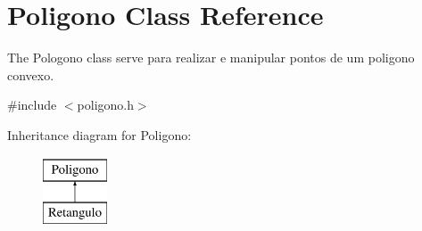 \hypertarget{class_poligono}{}\section{Poligono Class Reference}
\label{class_poligono}


The Pologono class serve para realizar e manipular pontos de um poligono convexo.  




{\ttfamily \#include $<$poligono.\+h$>$}

Inheritance diagram for Poligono\+:\begin{figure}[H]
\begin{center}
\leavevmode
\includegraphics[height=2.000000cm]{class_poligono}
\end{center}
\end{figure}
